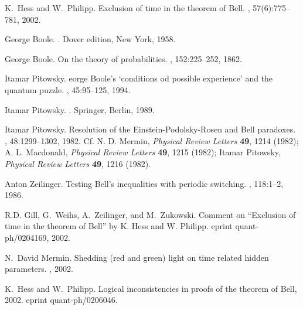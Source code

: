 \documentclass{epl}
\begin{document}
%
%

\begin{thebibliography}{10}

K.~Hess and W.~Philipp.
\newblock Exclusion of time in the theorem of {B}ell.
, 57(6):775--781, 2002.

George Boole.
.
\newblock Dover edition, New York, 1958.

George Boole.
\newblock On the theory of probabilities.
,
  152:225--252, 1862.

Itamar Pitowsky.
eorge {B}oole's `conditions od possible experience' and the
  quantum puzzle.
, 45:95--125, 1994.

Itamar Pitowsky.
.
\newblock Springer, Berlin, 1989.

Itamar Pitowsky.
\newblock Resolution of the {E}instein-{P}odolsky-{R}osen and {B}ell paradoxes.
, 48:1299--1302, 1982.
\newblock Cf. N. D. Mermin, {\sl Physical Review Letters} {\bf 49}, 1214
  (1982); A. L. Macdonald, {\sl Physical Review Letters} {\bf 49}, 1215 (1982);
  Itamar Pitowsky, {\sl Physical Review Letters} {\bf 49}, 1216 (1982).

Anton Zeilinger.
\newblock Testing {B}ell's inequalities with periodic switching.
, 118:1--2, 1986.

R.D. Gill, G.~Weihs, A.~Zeilinger, and M.~Zukowski.
\newblock Comment on ``{E}xclusion of time in the theorem of {B}ell'' by {K}.
  {H}ess and {W}. {P}hilipp.
\newblock eprint quant-ph/0204169, 2002.

N.~David Mermin.
\newblock Shedding (red and green) light on time related hidden parameters.
, 2002.

K.~Hess and W.~Philipp.
\newblock Logical inconsistencies in proofs of the theorem of {B}ell, 2002.
\newblock eprint quant-ph/0206046.

\end{thebibliography}
\end{document}
